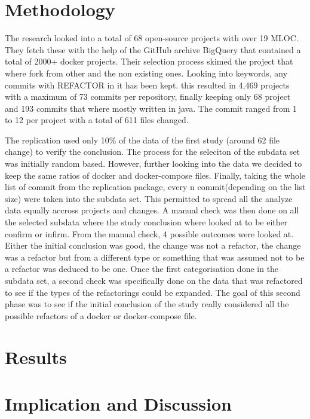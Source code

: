 \documentclass[lettersize,journal]{IEEEtran}
\begin{document}
\section{Methodology}

The research looked into a total of 68 open-source projects with over 19 MLOC. 
They fetch these with the help of the GitHub archive BigQuery that contained a total of 2000+ docker projects.
Their selection process skimed the project that where fork from other and the non existing ones.
Looking into keywords, any commits with REFACTOR in it has been kept.
this resulted in 4,469 projects with a maximum of 73 commits per repository, finally keeping only 68 project and 193 commits that where mostly written in java.
The commit ranged from 1 to 12 per project with a total of 611 files changed.

The replication used only 10\% of the data of the first study (around 62 file change) to verify the conclusion.
The process for the seleciton of the subdata set was initially random based. 
However, further looking into the data we decided to keep the same ratios of docker and docker-compose files.
Finally, taking the whole list of commit from the replication package, every n commit(depending on the list size) were taken into the subdata set.
This permitted to spread all the analyze data equally accross projects and changes.
A manual check was then done on all the selected subdata where the study conclusion where looked at to be either confirm or infirm.
From the manual check, 4 possible outcomes were looked at.
Either the initial conclusion was good, the change was not a refactor, the change was a refactor but from a different type or something that was assumed not to be a refactor was deduced to be one.
Once the first categorisation done in the subdata set, a second check was specifically done on the data that was refactored to see if the types of the refactorings could be expanded.
The goal of this second phase was to see if the initial conclusion of the study really considered all the possible refactors of a docker or docker-compose file.


\section{Results}

\section{Implication and Discussion}
\end{document}
